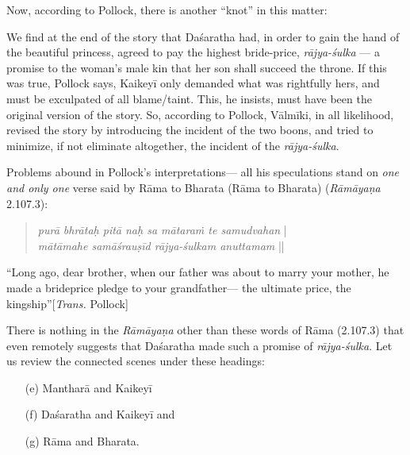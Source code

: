 Now, according to Pollock, there is another “knot” in this matter: 
\newpage

We find at the end of the story that Daśaratha had, in order to gain the hand of the beautiful princess, agreed to pay the highest bride-price, {\sl rājya-śulka} --- a promise to the woman’s male kin that her son shall succeed the throne. If this was true, Pollock says, Kaikeyī only demanded what was rightfully hers, and must be exculpated of all blame/taint. This, he insists, must have been the original version of the story. So, according to Pollock, Vālmīki, in all likelihood, revised the story by introducing the incident of the two boons, and tried to minimize, if not eliminate altogether, the incident of the {\sl rājya-śulka}.

Problems abound in Pollock’s interpretations— all his speculations stand on {\sl one and only one} verse said by Rāma to Bharata (Rāma to Bharata) ({\sl Rāmāyaṇa} 2.107.3): 
\begin{quote}
{{\sl purā bhrātaḥ pitā naḥ sa mātaraṁ te samudvahan}}\label{verse33} |\\
{\sl mātāmahe samāśrauṣīd rājya-śulkam anuttamam} || 
\end{quote}

\begin{myquote}
“Long ago, dear brother, when our father was about to marry your mother, he made a brideprice pledge to your grandfather--- the ultimate price, the kingship”\hfill [{\sl Trans.} Pollock]
\end{myquote}

There is nothing in the {\sl Rāmāyaṇa} other than these words of Rāma (2.107.3) that even remotely suggests that Daśaratha made such a promise of {\sl rājya-śulka}. Let us review the connected scenes under these headings: 
\begin{itemize}
\itemsep=0pt
\item[(e)] Mantharā and Kaikeyī 
\item[(f)] Daśaratha and Kaikeyī and 
\item[(g)] Rāma and Bharata.
\end{itemize}

